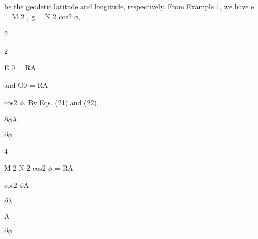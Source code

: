 \documentclass[a4paper,portrait,12pt]{article}
\begin{document}
\begin{flushleft}
be the geodetic latitude and longitude, respectively. From Example 1, we have e = M 2 , g = N 2 cos2 $\phi$,
\end{flushleft}


2


2


\begin{flushleft}
E 0 = RA
\end{flushleft}


\begin{flushleft}
and G0 = RA
\end{flushleft}


\begin{flushleft}
cos2 $\phi$. By Eqs. (21) and (22),
\end{flushleft}


\newpage



\begin{flushleft}
\newpage
 $\partial$$\phi$A
\end{flushleft}


\newpage



\begin{flushleft}
\newpage
 $\partial$$\phi$
\end{flushleft}


\newpage



4


\begin{flushleft}
M 2 N 2 cos2 $\phi$ = RA
\end{flushleft}


\begin{flushleft}
cos2 $\phi$A \newpage

\end{flushleft}


\begin{flushleft}
\newpage
 $\partial$$\lambda$
\end{flushleft}


\begin{flushleft}
\newpage
 A
\end{flushleft}


\newpage



\begin{flushleft}
$\partial$$\phi$
\end{flushleft}
\end{document}
